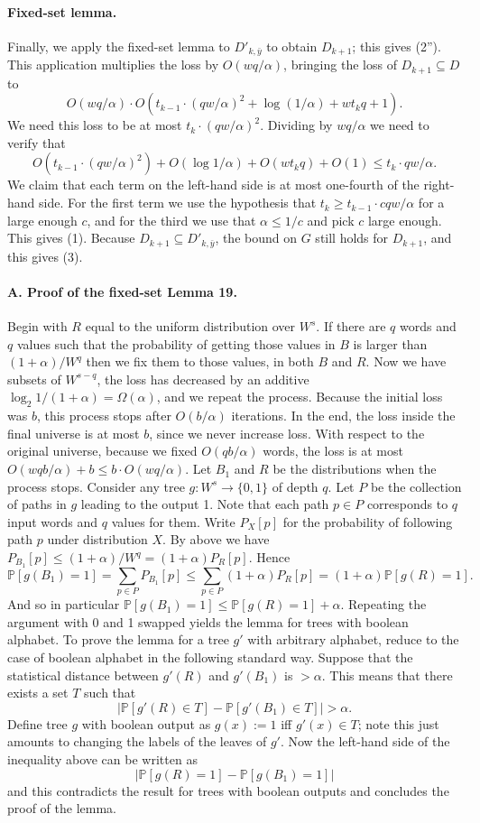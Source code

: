 \documentclass[10pt,a4paper]{article}
\begin{document}
\paragraph{Fixed-set lemma.}
Finally, we apply the fixed-set lemma to $D'_{k,\bar y}$ to obtain $D_{k+1}$; this gives (2''). This application multiplies the loss by $O(wq/\alpha)$, bringing the loss of $D_{k+1}\subseteq D$ to
\[O(wq/\alpha)\cdot O(t_{k-1}\cdot(qw/\alpha)^2+\log(1/\alpha)+wt_kq+1).\]
We need this loss to be at most $t_k\cdot(qw/\alpha)^2$. Dividing by $wq/\alpha$ we need to verify that
\[O(t_{k-1}\cdot(qw/\alpha)^2)+O(\log1/\alpha)+O(wt_kq)+O(1)\leq t_k\cdot qw/\alpha.\]
We claim that each term on the left-hand side is at most one-fourth of the right-hand side. For the first term we use the hypothesis that $t_k\geq t_{k-1}\cdot cqw/\alpha$ for a large enough $c$, and for the third we use that $\alpha\leq1/c$ and pick $c$ large enough. This gives (1).
Because $D_{k+1}\subseteq D'_{k,\bar y}$, the bound on $G$ still holds for $D_{k+1}$, and this gives (3).

\paragraph{A. Proof of the fixed-set Lemma 19.}
Begin with $R$ equal to the uniform distribution over $W^s$. If there are $q$ words and $q$ values such that the probability of getting those values in $B$ is larger than $(1+\alpha)/W^q$ then we fix them to those values, in both $B$ and $R$. Now we have subsets of $W^{s-q}$, the loss has decreased by an additive $\log_2 1/(1+\alpha)=\Omega(\alpha)$, and we repeat the process.
Because the initial loss was $b$, this process stops after $O(b/\alpha)$ iterations. In the end, the loss inside the final universe is at most $b$, since we never increase loss. With respect to the original universe, because we fixed $O(qb/\alpha)$ words, the loss is at most $O(wqb/\alpha)+b\leq b\cdot O(wq/\alpha)$.
Let $B_1$ and $R$ be the distributions when the process stops. Consider any tree $g:W^s\to\{0,1\}$ of depth $q$. Let $P$ be the collection of paths in $g$ leading to the output 1. Note that each path $p\in P$ corresponds to $q$ input words and $q$ values for them. Write $P_X[p]$ for the probability of following path $p$ under distribution $X$. By above we have $P_{B_1}[p]\leq(1+\alpha)/W^q=(1+\alpha)P_R[p]$.
Hence
\[\mathbb P[g(B_1)=1]=\sum_{p\in P}P_{B_1}[p]\leq\sum_{p\in P}(1+\alpha)P_R[p]=(1+\alpha)\mathbb P[g(R)=1].\]
And so in particular $\mathbb P[g(B_1)=1]\leq\mathbb P[g(R)=1]+\alpha$.
Repeating the argument with 0 and 1 swapped yields the lemma for trees with boolean alphabet. To prove the lemma for a tree $g'$ with arbitrary alphabet, reduce to the case of boolean alphabet in the following standard way. Suppose that the statistical distance between $g'(R)$ and $g'(B_1)$ is $>\alpha$. This means that there exists a set $T$ such that
\[|\mathbb P[g'(R)\in T]-\mathbb P[g'(B_1)\in T]|>\alpha.\]
Define tree $g$ with boolean output as $g(x):=1$ iff $g'(x)\in T$; note this just amounts to changing the labels of the leaves of $g'$. Now the left-hand side of the inequality above can be written as
\[|\mathbb P[g(R)=1]-\mathbb P[g(B_1)=1]|\]
and this contradicts the result for trees with boolean outputs and concludes the proof of the lemma.
\end{document}
